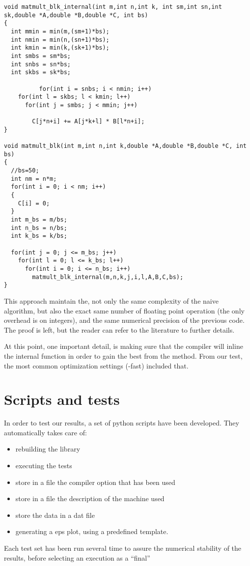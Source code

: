 \begin{lstlisting}
void matmult_blk_internal(int m,int n,int k, int sm,int sn,int sk,double *A,double *B,double *C, int bs)
{
  int mmin = min(m,(sm+1)*bs);
  int nmin = min(n,(sn+1)*bs);
  int kmin = min(k,(sk+1)*bs);
  int smbs = sm*bs;
  int snbs = sn*bs;
  int skbs = sk*bs;

		  for(int i = snbs; i < nmin; i++)
    for(int l = skbs; l < kmin; l++)
      for(int j = smbs; j < mmin; j++)
  
        C[j*n+i] += A[j*k+l] * B[l*n+i];
}

void matmult_blk(int m,int n,int k,double *A,double *B,double *C, int bs)
{
  //bs=50;
  int nm = n*m;
  for(int i = 0; i < nm; i++)  
  {
    C[i] = 0;
  }
  int m_bs = m/bs;
  int n_bs = n/bs;
  int k_bs = k/bs;

  for(int j = 0; j <= m_bs; j++)
    for(int l = 0; l <= k_bs; l++)
      for(int i = 0; i <= n_bs; i++)    
        matmult_blk_internal(m,n,k,j,i,l,A,B,C,bs);
}
\end{lstlisting}

This approach maintain the, not only the same complexity of the naive algorithm, but also the exact same number of floating point operation (the only overhead is on integers), and the same numerical precision of the previous code. The proof is left, but the reader can refer to the literature to further details.

At this point, one important detail, is making sure that the compiler will inline the internal function in order to gain the best from the method. From our test, the most common optimization settings (-fast) included that. 



\section{Scripts and tests}

In order to test our results, a set of python scripts have been developed.
They automatically takes care of:
\begin{itemize}
\item rebuilding the library
\item executing the tests
\item store in a file the compiler option that has been used
\item store in a file the description of the machine used
\item store the data in a dat file
\item generating a eps plot, using a predefined template.
\end{itemize}

Each test set has been run several time to assure the numerical stability of the results, before selecting an execution as a “final”
